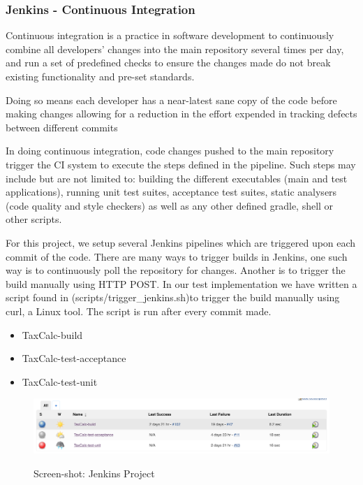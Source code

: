 \subsubsection{Jenkins - Continuous Integration}
Continuous integration is a practice in software development to continuously combine all developers’ changes into the main repository several times per day, and run a set of predefined checks to ensure the changes made do not break existing functionality and pre-set standards. 
\par
Doing so means each developer has a near-latest sane copy of the code before making changes allowing for a reduction in the effort expended in tracking defects between different commits  
\par
In doing continuous integration, code changes pushed to the main repository  trigger the CI system to execute the steps defined in the pipeline.
Such steps may include but are not limited to: building the different executables (main and test applications), running unit test suites, acceptance test suites, static analysers (code quality and style checkers) as well as any other defined gradle, shell or other scripts.  
\par
For this project, we setup several Jenkins pipelines which are triggered upon each commit of the code. There are many ways to trigger builds in Jenkins, one such way is to continuously poll the repository for changes. 
Another is to trigger the build manually using HTTP POST. In our test implementation we have written a script found in (scripts/trigger\_jenkins.sh)to trigger the build manually using curl, a Linux tool. The script is run after every commit made. 
\begin{itemize}
    \item TaxCalc-build
	\item TaxCalc-test-acceptance
	\item TaxCalc-test-unit
\end{itemize}

\begin{figure}[H]
\includegraphics[scale=0.4]{res/jenkins.png}
\label{fig:jenkins-screenshot}
\caption{Screen-shot: Jenkins Project}
\end{figure}
